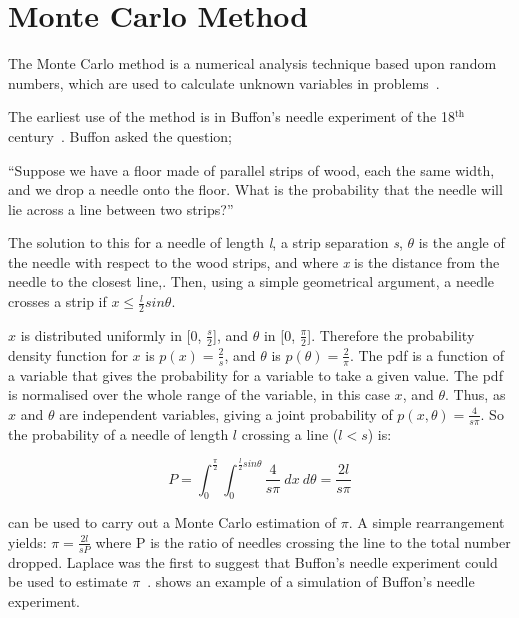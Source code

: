 \section{Monte Carlo Method}\label{sec:mcmethod}
The Monte Carlo method is a numerical analysis technique based upon random numbers, which are used to calculate unknown variables in problems~\cite{cashwell1959practical,rogers1990monte}. 

The earliest use of the method is in Buffon's needle experiment of the 18$^{\text{th}}$ century~\cite{badger1994lazzarini,beckmann2015history,buffon1785histoire}. Buffon asked the question;

\medskip

``Suppose we have a floor made of parallel strips of wood, each the same width, and we drop a needle onto the floor. What is the probability that the needle will lie across a line between two strips?''

\medskip

The solution to this for a needle of length \textit{l}, a strip separation \textit{s}, $\theta$ is the angle of the needle with respect to the wood strips, and where \textit{x} is the distance from the needle to the closest line,. Then, using a simple geometrical argument, a needle crosses a strip if $x \leq \tfrac{l}{2} sin \theta$.

$x$ is distributed uniformly in [0, $\tfrac{s}{2}$], and $\theta$ in [0, $\tfrac{\pi}{2}$]. Therefore the probability density function for $x$ is $p(x)=\tfrac{2}{s}$, and $\theta$ is $p(\theta) = \tfrac{2}{\pi}$. The \gls*{pdf} is a function of a variable that gives the probability for a variable to take a given value. The \gls*{pdf} is normalised over the whole range of the variable, in this case $x$, and $\theta$.
Thus, as $x$ and $\theta$ are independent variables, giving a joint probability of $p(x,\theta) = \tfrac{4}{s \pi}$.
So the probability of a needle of length $l$ crossing a line ($l<s$) is:

\begin{equation}
P=\int_0^{\frac{\pi}{2}}\int_0^{\frac{l}{2}sin\theta}\frac{4}{s\pi}\ dx\ d\theta = \frac{2 l}{s \pi}\label{eqn:buffon}
\end{equation}


 can be used to carry out a Monte Carlo estimation of $\pi$. A simple rearrangement yields: $\pi = \tfrac{2l}{sP}$ where P is the ratio of needles crossing the line to the total number dropped. Laplace was the first to suggest that Buffon's needle experiment could be used to estimate $\pi$~\cite{beckmann2015history}. 
 shows an example of a simulation of Buffon's needle experiment.

